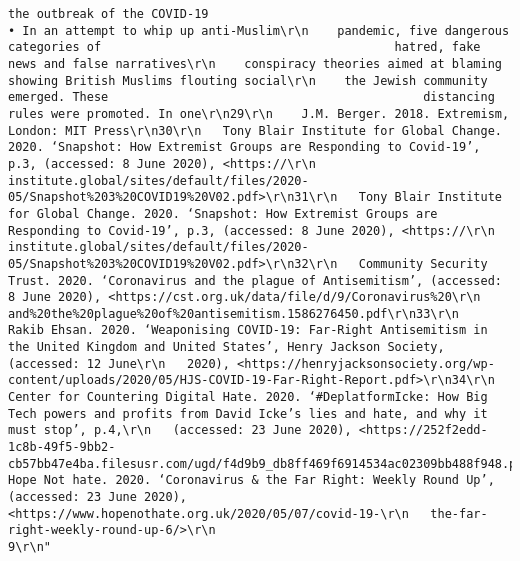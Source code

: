 \documentclass[
]{book}
\begin{document}
\begin{verbatim}
the outbreak of the COVID-19                                           • In an attempt to whip up anti-Muslim\r\n    pandemic, five dangerous categories of                                         hatred, fake news and false narratives\r\n    conspiracy theories aimed at blaming                                           showing British Muslims flouting social\r\n    the Jewish community emerged. These                                            distancing rules were promoted. In one\r\n29\r\n    J.M. Berger. 2018. Extremism, London: MIT Press\r\n30\r\n   Tony Blair Institute for Global Change. 2020. ‘Snapshot: How Extremist Groups are Responding to Covid-19’, p.3, (accessed: 8 June 2020), <https://\r\n   institute.global/sites/default/files/2020-05/Snapshot%203%20COVID19%20V02.pdf>\r\n31\r\n   Tony Blair Institute for Global Change. 2020. ‘Snapshot: How Extremist Groups are Responding to Covid-19’, p.3, (accessed: 8 June 2020), <https://\r\n   institute.global/sites/default/files/2020-05/Snapshot%203%20COVID19%20V02.pdf>\r\n32\r\n   Community Security Trust. 2020. ‘Coronavirus and the plague of Antisemitism’, (accessed: 8 June 2020), <https://cst.org.uk/data/file/d/9/Coronavirus%20\r\n   and%20the%20plague%20of%20antisemitism.1586276450.pdf\r\n33\r\n   Rakib Ehsan. 2020. ‘Weaponising COVID-19: Far-Right Antisemitism in the United Kingdom and United States’, Henry Jackson Society, (accessed: 12 June\r\n   2020), <https://henryjacksonsociety.org/wp-content/uploads/2020/05/HJS-COVID-19-Far-Right-Report.pdf>\r\n34\r\n   Center for Countering Digital Hate. 2020. ‘#DeplatformIcke: How Big Tech powers and profits from David Icke’s lies and hate, and why it must stop’, p.4,\r\n   (accessed: 23 June 2020), <https://252f2edd-1c8b-49f5-9bb2-cb57bb47e4ba.filesusr.com/ugd/f4d9b9_db8ff469f6914534ac02309bb488f948.pdf>\r\n35\r\n   Hope Not hate. 2020. ‘Coronavirus & the Far Right: Weekly Round Up’, (accessed: 23 June 2020), <https://www.hopenothate.org.uk/2020/05/07/covid-19-\r\n   the-far-right-weekly-round-up-6/>\r\n                                                                             9\r\n"                                                                                                                                                                                                                                                                                                                                                                                                                                                                                                                                                                                           

\end{verbatim}
\end{document}
